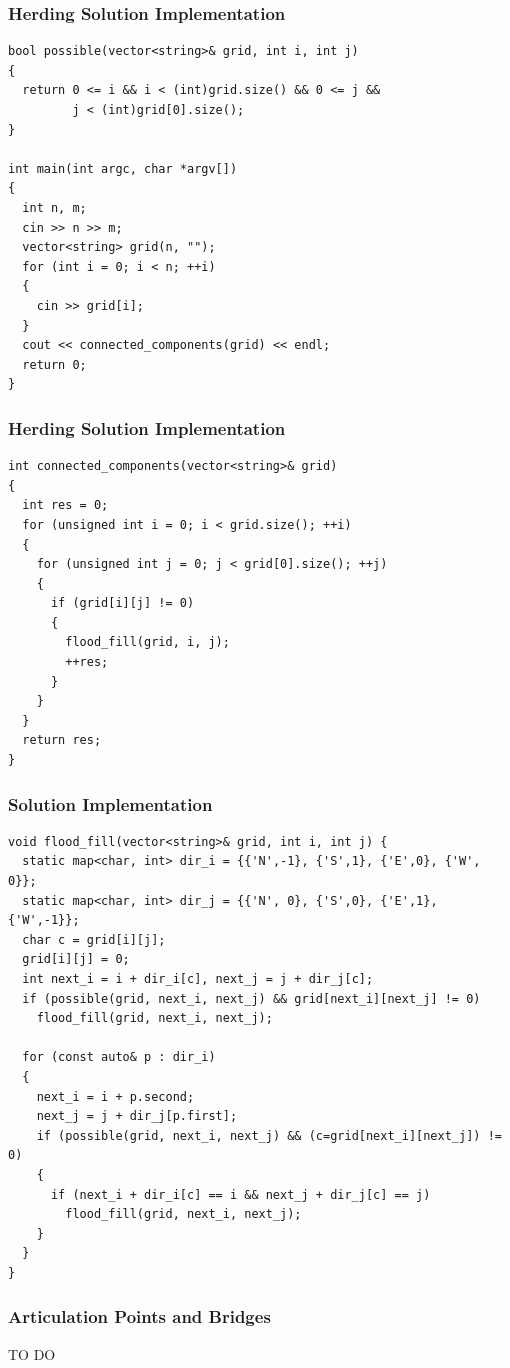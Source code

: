 \documentclass{beamer}
\begin{document}
\begin{frame}[containsverbatim]
\frametitle{Herding Solution Implementation}
\scriptsize
\begin{lstlisting}
bool possible(vector<string>& grid, int i, int j)
{
  return 0 <= i && i < (int)grid.size() && 0 <= j &&
         j < (int)grid[0].size();
}

int main(int argc, char *argv[])
{
  int n, m;
  cin >> n >> m;
  vector<string> grid(n, "");
  for (int i = 0; i < n; ++i)
  {
    cin >> grid[i];
  }
  cout << connected_components(grid) << endl;
  return 0;
}
\end{lstlisting}

\end{frame}

\begin{frame}[containsverbatim]
\frametitle{Herding Solution Implementation}
\scriptsize
\begin{lstlisting}
int connected_components(vector<string>& grid)
{
  int res = 0;
  for (unsigned int i = 0; i < grid.size(); ++i)
  {
    for (unsigned int j = 0; j < grid[0].size(); ++j)
    {
      if (grid[i][j] != 0)
      {
        flood_fill(grid, i, j);
        ++res;
      }
    }
  }
  return res;
}
\end{lstlisting}

\end{frame}

\begin{frame}[containsverbatim]
\frametitle{Solution Implementation}
\scriptsize
\begin{lstlisting}
void flood_fill(vector<string>& grid, int i, int j) {
  static map<char, int> dir_i = {{'N',-1}, {'S',1}, {'E',0}, {'W', 0}};
  static map<char, int> dir_j = {{'N', 0}, {'S',0}, {'E',1}, {'W',-1}};
  char c = grid[i][j];
  grid[i][j] = 0;
  int next_i = i + dir_i[c], next_j = j + dir_j[c];
  if (possible(grid, next_i, next_j) && grid[next_i][next_j] != 0)
    flood_fill(grid, next_i, next_j);

  for (const auto& p : dir_i)
  {
    next_i = i + p.second;
    next_j = j + dir_j[p.first];
    if (possible(grid, next_i, next_j) && (c=grid[next_i][next_j]) != 0)
    {
      if (next_i + dir_i[c] == i && next_j + dir_j[c] == j)
        flood_fill(grid, next_i, next_j);
    }
  }
}
\end{lstlisting}

\end{frame}

\fi

\begin{frame}%
\frametitle{Articulation Points and Bridges}

TO DO

\end{frame}
\end{document}
